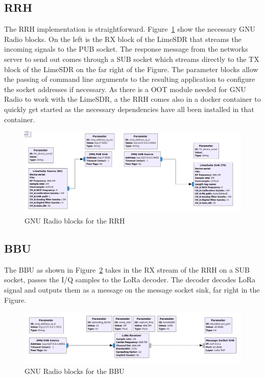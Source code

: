 \subsection{RRH}
The RRH implementation is straightforward. Figure~\ref{fig:RRH_impl} show the necessary 
GNU Radio blocks. On the left is the RX block of the LimeSDR that streams the incoming signals to the 
PUB socket. The response message from the networks server to send out comes through a SUB socket which 
streams directly to the TX block of the LimeSDR on the far right of the Figure.
The parameter blocks allow the passing of command line arguments to the resulting application to configure
the socket addresses if necessary. As there is a OOT module needed for GNU Radio to work with the LimeSDR, a the 
RRH comes also in a docker container to quickly get started as the necessary dependencies have all been installed
in that container.
\begin{figure}[h]
    \centering
    \includegraphics[width=1\textwidth]{figures/RRH_impl.png}
    \caption{GNU Radio blocks for the RRH}
    \label{fig:RRH_impl}
\end{figure}

\subsection{BBU}
The BBU as shown in Figure~\ref{fig:BBU_impl} takes in the RX stream of the RRH on a SUB socket,
passes the I/Q samples to the LoRa decoder. The decoder decodes LoRa signal and outputs them as a 
message on the message socket sink, far right in the Figure.


\begin{figure}[h]
    \centering
    \includegraphics[width=1\textwidth]{figures/BBU_impl.png}
    \caption{GNU Radio blocks for the BBU}
    \label{fig:BBU_impl}
\end{figure}

